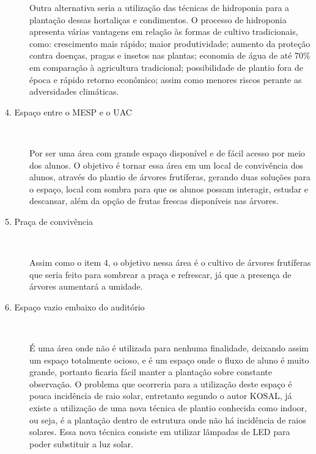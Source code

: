 \begin{description}
      Outra alternativa seria a utilização das técnicas de hidroponia para a plantação dessas hortaliças e condimentos. O processo de
      hidroponia apresenta várias vantagens em relação às formas de cultivo tradicionais, como: crescimento mais rápido; maior produtividade;
      aumento da proteção contra doenças, pragas e insetos nas plantas; economia de água de até 70\% em comparação à agricultura tradicional;
      possibilidade de plantio fora de época e rápido retorno econ\^{o}mico; assim como menores riscos perante as adversidades climáticas.

    \item[4. Espaço entre o MESP e o UAC] \

      Por ser uma área com grande espaço disponível e de fácil acesso por meio dos alunos. O objetivo é tornar essa área em um local de
      convivência dos alunos, através do plantio de árvores frutíferas, gerando duas soluções para o espaço, local com sombra para que os
      alunos possam interagir, estudar e descansar, além da opção de frutas frescas disponíveis nas árvores.

    \item[5. Praça de convivência] \

      Assim como o item 4, o objetivo nessa área é o cultivo de árvores frutíferas que seria feito para sombrear a praça e refrescar, já
      que a presença de árvores aumentará a umidade.

    \item[6. Espaço vazio embaixo do auditório] \

      É uma área onde não é utilizada para nenhuma finalidade, deixando assim um espaço totalmente ocioso, e é um espaço onde o fluxo de
      aluno é muito grande, portanto ficaria fácil manter a plantação sobre constante observação. O problema que ocorreria para
      a utilização deste espaço é pouca incidência de raio solar, entretanto segundo o autor KOSAL, já existe a utilização de uma nova
      técnica de plantio conhecida como indoor, ou seja, é a plantação dentro de estrutura onde não há incidência de raios solares. Essa
      nova técnica consiste em utilizar l\^{a}mpadas de LED para poder substituir a luz solar.

  \end{description}
